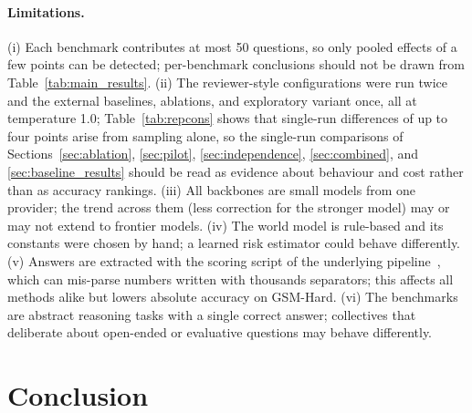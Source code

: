 \documentclass[manuscript, screen, review]{acmart}
\begin{document}
\paragraph{Limitations.}
(i) Each benchmark contributes at most 50 questions, so only pooled effects of a few points can be detected; per-benchmark conclusions should not be drawn from Table~\ref{tab:main_results}.
(ii) The reviewer-style configurations were run twice and the external baselines, ablations, and exploratory variant once, all at temperature 1.0; Table~\ref{tab:repcons} shows that single-run differences of up to four points arise from sampling alone, so the single-run comparisons of Sections~\ref{sec:ablation}, \ref{sec:pilot}, \ref{sec:independence}, \ref{sec:combined}, and \ref{sec:baseline_results} should be read as evidence about behaviour and cost rather than as accuracy rankings.
(iii) All backbones are small models from one provider; the trend across them (less correction for the stronger model) may or may not extend to frontier models.
(iv) The world model is rule-based and its constants were chosen by hand; a learned risk estimator could behave differently.
(v) Answers are extracted with the scoring script of the underlying pipeline~\cite{wang2025mars}, which can mis-parse numbers written with thousands separators; this affects all methods alike but lowers absolute accuracy on GSM-Hard.
(vi) The benchmarks are abstract reasoning tasks with a single correct answer; collectives that deliberate about open-ended or evaluative questions may behave differently.

\section{Conclusion}
\end{document}

